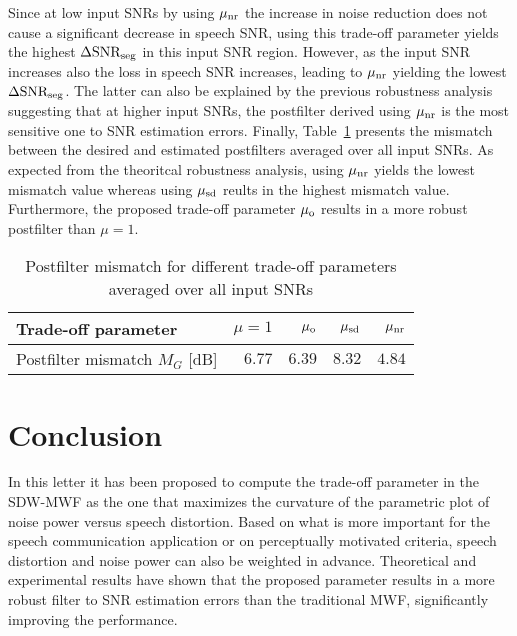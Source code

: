 \documentclass[10pt]{IEEEtran}
\begin{document}
Since at low input SNRs by using $\mu_{\rm nr}$ the increase in noise reduction does not cause a significant decrease in speech SNR, using this trade-off parameter yields the highest $\Delta \text{SNR}_{\rm seg}$ in this input SNR region.   
However, as the input SNR increases also the loss in speech SNR increases, leading to $\mu_{\rm nr}$ yielding the lowest $\Delta \text{SNR}_{\rm seg}$.
The latter can also be explained by the previous robustness analysis suggesting that at higher input SNRs, the postfilter derived using $\mu_{\rm nr}$ is the most sensitive one to SNR estimation errors. \newline
Finally, Table~\ref{tbl: err} presents the mismatch between the desired and estimated postfilters averaged over all input SNRs. 
As expected from the theoritcal robustness analysis, using $\mu_{\rm nr}$ yields the lowest mismatch value whereas using $\mu_{\rm sd}$ reults in the highest mismatch value. 
Furthermore, the proposed trade-off parameter $\mu_{\rm o}$ results in a more robust postfilter than $\mu = 1$.
\begin{table}[t]
\begin{center}
  \caption{Postfilter mismatch for different trade-off parameters averaged over all input SNRs}
  \label{tbl: err}
  \begin{tabularx}{\linewidth}{Xrrrr}
    \toprule
      Trade-off parameter & $\mu = 1$ & $\mu_{\rm o}$ & $\mu_{\rm sd}$ & $\mu_{\rm nr}$\\
      \midrule
      Postfilter mismatch $M_G$ [dB] & $6.77$ & $6.39$ & $8.32$ & $4.84$ \\
    \bottomrule
  \end{tabularx}
\end{center}
\end{table}

\section{Conclusion}
In this letter it has been proposed to compute the trade-off parameter in the SDW-MWF as the one that maximizes the curvature of the parametric plot of noise power versus speech distortion.
Based on what is more important for the speech communication application or on perceptually motivated criteria, speech distortion and noise power can also be weighted in advance.
Theoretical and experimental results have shown that the proposed parameter results in a more robust filter to SNR estimation errors than the traditional MWF, significantly improving the performance.


\end{document}
